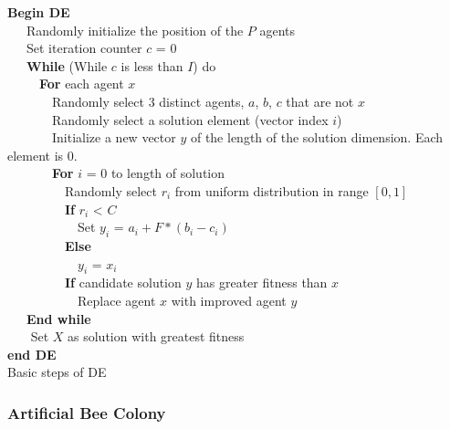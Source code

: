 \documentclass{tamuccthesis}
\begin{document}
\begin{algorithm}%
\textbf{Begin DE}\\
~~~Randomly initialize the position of the $P$ agents\\
~~~Set iteration counter $c$ = 0 \\
~~~\textbf{While} (While $c$ is less than $I$) do\\
~~~~~\textbf{For} each agent $x$ \\
~~~~~~~Randomly select 3 distinct agents, $a$, $b$, $c$ that are not $x$ \\
~~~~~~~Randomly select a solution element (vector index $i$) \\
~~~~~~~Initialize a new vector $y$ of the length of the solution dimension. Each element is $0$. \\
~~~~~~~\textbf{For} $i$ = 0 to length of solution \\
~~~~~~~~~Randomly select $r_i$ from uniform distribution in range $[0, 1]$ \\
~~~~~~~~~\textbf{If} $r_i$ < $C$ \\
~~~~~~~~~~~Set $y_i$ = $a_i + F * (b_i - c_i)$ \\
~~~~~~~~~\textbf{Else} \\
~~~~~~~~~~~$y_i$ = $x_i$ \\
~~~~~~~~~\textbf{If} candidate solution $y$ has greater fitness than $x$ \\
~~~~~~~~~~~Replace agent $x$ with improved agent $y$ \\
~~~\textbf{End while} \\
~~~ Set $X$ as solution with greatest fitness \\
\textbf{end DE}\\
\caption{Basic steps of DE}
\label{DE}
\end{algorithm}

\subsubsection{Artificial Bee Colony}
\end{document}
